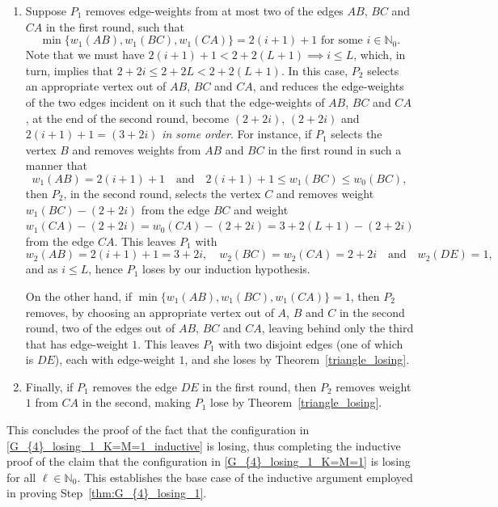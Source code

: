 \documentclass[11pt,reqno]{amsart}
\theoremstyle{definition}
\theoremstyle{definition}
\begin{document}
\begin{enumerate}
If, on the other hand, $\min\{w_{1}(AB),w_{1}(BC),w_{1}(CA)\}=0$, then, after the first round, $P_{2}$ is left with a galaxy graph with two components, one of which is the edge $DE$ with edge-weight $1$, while the other has at least one ray whose edge-weight is at least $2+2(L+1)$. It is evident from Theorem~\ref{thm:galaxy} that $P_{2}$ wins.  

\item Suppose $P_{1}$ removes edge-weights from at most two of the edges $AB$, $BC$ and $CA$ in the first round, such that 
\begin{equation}
\min\{w_{1}(AB),w_{1}(BC),w_{1}(CA)\}=2(i+1)+1 \text{ for some } i \in \mathbb{N}_{0}.\nonumber
\end{equation}
Note that we must have $2(i+1)+1 < 2+2(L+1) \implies i \leqslant L$, which, in turn, implies that $2+2i\leqslant 2+2L < 2+2(L+1)$. In this case, $P_{2}$ selects an appropriate vertex out of $AB$, $BC$ and $CA$, and reduces the edge-weights of the two edges incident on it such that the edge-weights of $AB$, $BC$ and $CA$, at the end of the second round, become $(2+2i)$, $(2+2i)$ and $2(i+1)+1=(3+2i)$ \emph{in some order}. For instance, if $P_{1}$ selects the vertex $B$ and removes weights from $AB$ and $BC$ in the first round in such a manner that
\begin{equation}
w_{1}(AB)=2(i+1)+1 \quad \text{and} \quad 2(i+1)+1 \leqslant w_{1}(BC) \leqslant w_{0}(BC),\nonumber
\end{equation}
then $P_{2}$, in the second round, selects the vertex $C$ and removes weight $w_{1}(BC)-(2+2i)$ from the edge $BC$ and weight $w_{1}(CA)-(2+2i)=w_{0}(CA)-(2+2i)=3+2(L+1)-(2+2i)$ from the edge $CA$. This leaves $P_{1}$ with
\begin{equation}
w_{2}(AB)=2(i+1)+1=3+2i, \quad w_{2}(BC)=w_{2}(CA)=2+2i \quad \text{and} \quad w_{2}(DE)=1,\nonumber
\end{equation}
and as $i \leqslant L$, hence $P_{1}$ loses by our induction hypothesis.

On the other hand, if $\min\{w_{1}(AB),w_{1}(BC),w_{1}(CA)\}=1$, then $P_{2}$ removes, by choosing an appropriate vertex out of $A$, $B$ and $C$ in the second round, two of the edges out of $AB$, $BC$ and $CA$, leaving behind only the third that has edge-weight $1$. This leaves $P_{1}$ with two disjoint edges (one of which is $DE$), each with edge-weight $1$, and she loses by Theorem~\ref{triangle_losing}.

\item Finally, if $P_{1}$ removes the edge $DE$ in the first round, then $P_{2}$ removes weight $1$ from $CA$ in the second, making $P_{1}$ lose by Theorem~\ref{triangle_losing}.
\end{enumerate}
This concludes the proof of the fact that the configuration in \eqref{G_{4}_losing_1_K=M=1_inductive} is losing, thus completing the inductive proof of the claim that the configuration in \eqref{G_{4}_losing_1_K=M=1} is losing for all $\ell \in \mathbb{N}_{0}$. This establishes the base case of the inductive argument employed in proving Step~\eqref{thm:G_{4}_losing_1}.
\end{document}
